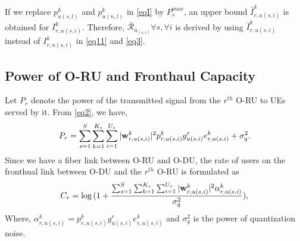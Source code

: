\documentclass[conference]{IEEEtran}
\begin{document}
If we replace $p_{u(s,l)}^{k}$ and $p_{u(n,l)}^{k}$ in \eqref{eqI} by $P_{s}^{max}$, an upper bound $\bar{I}_{r,u(s,i)}^{k}$ is obtained for $I_{r,u(s,i)}^{k}$. Therefore, $\bar{\mathcal{R}}_{u_{(s,i)}} \forall s , \forall i$ is derived by using $\bar{I}_{r,u(s,i)}^{k}$ instead of $I_{r,u(s,i)}^{k}$ in  \eqref{eq11} and \eqref{eq3}.
\subsection{Power of O-RU and Fronthaul Capacity}
Let $P_r$ denote the power of the transmitted signal from the $r^{th}$ O-RU to UEs served by it. From \eqref{eq2}, we have,
\begin{equation}\label{pr}
P_r = \sum_{s=1}^{S}\sum_{k=1}^{K_s}\sum_{i=1}^{U_s}|\bold{w}_{r,u(s,i)}^{k}|^2 p_{r,u(s,i)}^{k} g_{u(s,i)}^r e^k_{r,u(s,i)}+ \sigma_{q}^2.
\end{equation}
Since we have a fiber link between O-RU and O-DU, the rate of users on the fronthual link between O-DU and the $r^{th}$ O-RU  is formulated as
\begin{equation}\label{cr}
C_{r} = \log{(1+ \frac{\sum_{s=1}^{S}\sum_{k=1}^{K_s}\sum_{i=1}^{U_s}|\bold{w}_{r,u(s,i)}^{k}|^2 \mathcal{\alpha}^k_{r,u(s,i)} }{ \sigma_{q}^2})},
\end{equation}
Where, $\mathcal{\alpha}^k_{r,u(s,i)}= p_{r,u(s,i)}^{k} g_{u(s,i)}^r e^k_{r,u(s,i)}$ and $\sigma_{q}^2$ is the power of quantization noise.
\end{document}
